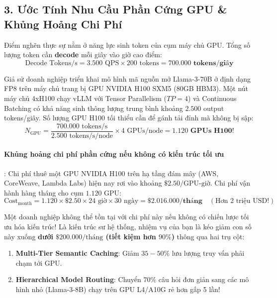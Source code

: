 \subsection{3. Ước Tính Nhu Cầu Phần Cứng GPU \& Khủng Hoảng Chi Phí}
Điểm nghẽn thực sự nằm ở năng lực sinh token của cụm máy chủ GPU.
Tổng số lượng token cần \textbf{decode} mỗi giây vào giờ cao điểm:
\begin{equation}
\text{Decode Tokens/s} = 3.500 \text{ QPS} \times 200 \text{ tokens} = \mathbf{700.000 \text{ tokens/giây}}
\end{equation}

Giả sử doanh nghiệp triển khai mô hình mã nguồn mở Llama-3-70B ở định dạng FP8 trên máy chủ trang bị GPU NVIDIA H100 SXM5 (80GB HBM3).
Một nút máy chủ 4xH100 chạy vLLM với Tensor Parallelism ($TP=4$) và Continuous Batching có khả năng sinh thông lượng trung bình khoảng $2.500$ output tokens/giây.
Số lượng GPU H100 tối thiểu cần để gánh tải đỉnh mà không bị sập:
\begin{equation}
N_{\text{GPU}} = \frac{700.000 \text{ tokens/s}}{2.500 \text{ tokens/s/node}} \times 4 \text{ GPUs/node} = \mathbf{1.120 \text{ GPUs H100}}!
\end{equation}

\paragraph{Khủng hoảng chi phí phần cứng nếu không có kiến trúc tối ưu}:
Chi phí thuê một GPU NVIDIA H100 trên hạ tầng đám mây (AWS, CoreWeave, Lambda Labs) hiện nay rơi vào khoảng $\$2.50\text{/GPU-giờ}$.
Chi phí vận hành hàng tháng cho cụm $1.120$ GPU:
\begin{equation*}
\text{Cost}_{\text{month}} = 1.120 \times \$2.50 \times 24 \text{ giờ} \times 30 \text{ ngày} = \mathbf{\$2.016.000\text{/tháng}} \quad (\text{Hơn 2 triệu USD!})
\end{equation*}

Một doanh nghiệp không thể tồn tại với chi phí này nếu không có chiến lược tối ưu hóa kiến trúc! Là kiến trúc sư hệ thống, nhiệm vụ của bạn là kéo giảm con số này xuống \textbf{dưới $\$200.000\text{/tháng}$ (tiết kiệm hơn $90\%$)} thông qua hai trụ cột:
\begin{enumerate}
  \item \textbf{Multi-Tier Semantic Caching}: Giảm $35 - 50\%$ lưu lượng truy vấn phải chạm tới GPU.
  \item \textbf{Hierarchical Model Routing}: Chuyển $70\%$ câu hỏi đơn giản sang các mô hình nhỏ (Llama-3-8B) chạy trên GPU L4/A10G rẻ hơn gấp 5 lần!
\end{enumerate}

